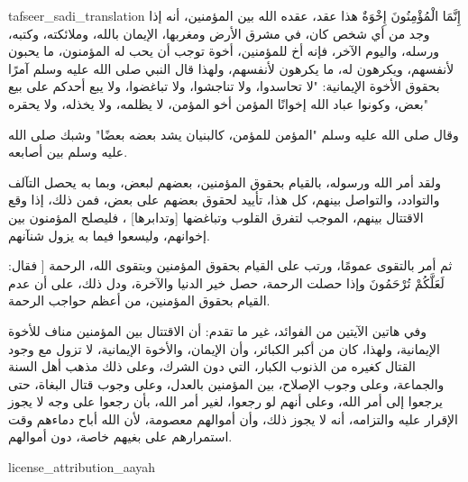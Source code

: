\begin{taggedblock}{tafseer_sadi_translation}
{ إِنَّمَا الْمُؤْمِنُونَ إِخْوَةٌ }
هذا عقد، عقده الله بين المؤمنين، أنه إذا وجد من أي شخص كان، في مشرق الأرض ومغربها، الإيمان بالله، وملائكته، وكتبه، ورسله، واليوم الآخر، فإنه أخ للمؤمنين، أخوة توجب أن يحب له المؤمنون، ما يحبون لأنفسهم، ويكرهون له، ما يكرهون لأنفسهم، ولهذا قال النبي صلى الله عليه وسلم آمرًا بحقوق الأخوة الإيمانية:
"لا تحاسدوا، ولا تناجشوا، ولا تباغضوا، ولا يبع أحدكم على بيع بعض، وكونوا عباد الله إخوانًا المؤمن أخو المؤمن، لا يظلمه، ولا يخذله، ولا يحقره"

وقال صلى الله عليه وسلم
"المؤمن للمؤمن، كالبنيان يشد بعضه بعضًا"
وشبك صلى الله عليه وسلم بين أصابعه.

ولقد أمر الله ورسوله، بالقيام بحقوق المؤمنين، بعضهم لبعض، وبما به يحصل التآلف والتوادد، والتواصل بينهم، كل هذا، تأييد لحقوق بعضهم على بعض، فمن ذلك، إذا وقع الاقتتال بينهم، الموجب لتفرق القلوب وتباغضها
[وتدابرها]
، فليصلح المؤمنون بين إخوانهم، وليسعوا فيما به يزول شنآنهم.

ثم أمر بالتقوى عمومًا، ورتب على القيام بحقوق المؤمنين وبتقوى الله، الرحمة [ فقال:
{ لَعَلَّكُمْ تُرْحَمُونَ }
وإذا حصلت الرحمة، حصل خير الدنيا والآخرة، ودل ذلك، على أن عدم القيام بحقوق المؤمنين، من أعظم حواجب الرحمة.

وفي هاتين الآيتين من الفوائد، غير ما تقدم: أن الاقتتال بين المؤمنين مناف للأخوة الإيمانية، ولهذا، كان من أكبر الكبائر، وأن الإيمان، والأخوة الإيمانية، لا تزول مع وجود القتال كغيره من الذنوب الكبار، التي دون الشرك، وعلى ذلك مذهب أهل السنة والجماعة، وعلى وجوب الإصلاح، بين المؤمنين بالعدل، وعلى وجوب قتال البغاة، حتى يرجعوا إلى أمر الله، وعلى أنهم لو رجعوا، لغير أمر الله، بأن رجعوا على وجه لا يجوز الإقرار عليه والتزامه، أنه لا يجوز ذلك، وأن أموالهم معصومة، لأن الله أباح دماءهم وقت استمرارهم على بغيهم خاصة، دون أموالهم.
\end{taggedblock}
\begin{taggedblock}{license_attribution_aayah}

\end{taggedblock}
\begin{comment}
Please use the following for footnotes:- Sample\footnoteQ{Text of Qur'an footnote goes here.}.
Sample\footnoteT{Text of Tafseer footnote goes here.}.
\end{comment}